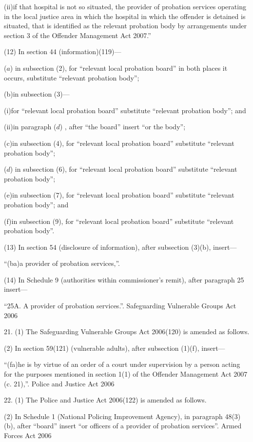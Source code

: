 \documentclass[12pt,a4paper]{article}
\begin{document}
(ii)if that hospital is not so situated, the provider of probation services operating in the local justice area in which the hospital in which the offender is detained is situated, that is identified as the relevant probation body by arrangements under section 3 of the Offender Management Act 2007.”

(12) In section 44 (information)(119)—

($a$) in subsection (2), for “relevant local probation board” in both places it occurs, substitute “relevant probation body”;

(b)in subsection (3)—

(i)for “relevant local probation board” substitute “relevant probation body”; and

(ii)in paragraph ($d$) , after “the board” insert “or the body”;

(c)in subsection (4), for “relevant local probation board” substitute “relevant probation body”;

($d$) in subsection (6), for “relevant local probation board” substitute “relevant probation body”;

(e)in subsection (7), for “relevant local probation board” substitute “relevant probation body”; and

(f)in subsection (9), for “relevant local probation board” substitute “relevant probation body”.

(13) In section 54 (disclosure of information), after subsection (3)(b), insert—

“(ba)a provider of probation services,”.

(14) In Schedule 9 (authorities within commissioner’s remit), after paragraph 25 insert—

“25A.  A provider of probation services.”.
Safeguarding Vulnerable Groups Act 2006

21.  (1)  The Safeguarding Vulnerable Groups Act 2006(120) is amended as follows.

(2) In section 59(121) (vulnerable adults), after subsection (1)(f), insert—

“(fa)he is by virtue of an order of a court under supervision by a person acting for the purposes mentioned in section 1(1) of the Offender Management Act 2007 (c. 21),”.
Police and Justice Act 2006

22.  (1)  The Police and Justice Act 2006(122) is amended as follows.

(2) In Schedule 1 (National Policing Improvement Agency), in paragraph 48(3)(b), after “board” insert “or officers of a provider of probation services”.
Armed Forces Act 2006
\end{document}
